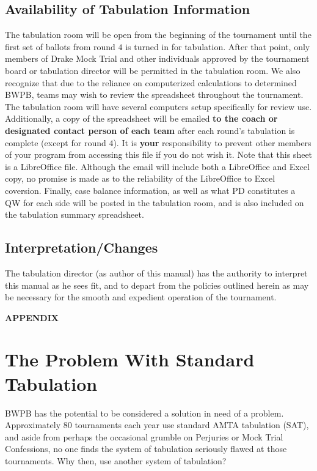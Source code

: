 \documentclass{article}
\begin{document}
\subsection{Availability of Tabulation Information}
The tabulation room will be open from the beginning of the tournament until the first set of ballots from round $4$ is turned in for tabulation.  After that point, only members of Drake Mock Trial and other individuals approved by the tournament board or tabulation director will be permitted in the tabulation room.  We also recognize that due to the reliance on computerized calculations to determined BWPB, teams may wish to review the spreadsheet throughout the tournament.  The tabulation room will have several computers setup specifically for review use.  Additionally, a copy of the spreadsheet will be emailed \textbf{to the coach or designated contact person of each team} after each round's tabulation is complete (except for round $4$). It is \textbf{your} responsibility to prevent other members of your program from accessing this file if you do not wish it. Note that this sheet is a LibreOffice file. Although the email will include both a LibreOffice and Excel copy, no promise is made as to the reliability of the LibreOffice to Excel coversion. Finally, case balance information, as well as what PD constitutes a QW for each side will be posted in the tabulation room, and is also included on the tabulation summary spreadsheet.
\subsection{Interpretation/Changes}
The tabulation director (as author of this manual) has the authority to interpret this manual as he sees fit, and to depart from the policies outlined herein as may be necessary for the smooth and expedient operation of the tournament.
\break
\appendix
\begin{center}
      {\bf APPENDIX}
    \end{center}
\section{The Problem With Standard Tabulation}
BWPB has the potential to be considered a solution in need of a problem.  Approximately 80 tournaments each year use standard AMTA tabulation (SAT), and aside from perhaps the occasional grumble on Perjuries or Mock Trial Confessions, no one finds the system of tabulation seriously flawed at those tournaments.  Why then, use another system of tabulation?
\end{document}
